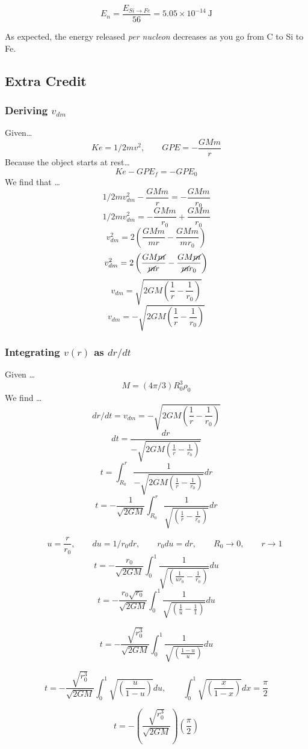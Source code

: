 \documentclass{article}
\begin{document}
\[
\boxed{
E_n = \frac{E_{Si\to Fe}}{56} = 5.05\times10^{-14}\ \mathrm{J}
}
\]

\noindent
As expected, the energy released \emph{per nucleon} decreases as you go from C to Si to Fe.

\subsection{Extra Credit}
\subsubsection{Deriving \(v_{dm}\)}
Given\dots
\[Ke = 1/2 mv^2, \qquad GPE = -\frac{GMm}{r}\]
 Because the object starts at rest\dots
\[Ke - GPE_{f} = - GPE_0\]
We find that \dots
\[1/2mv_{dm}^2 - \frac{GMm}{r} = -\frac{GMm}{r_0}\]
\[1/2mv_{dm}^2 = -\frac{GMm}{r_0} + \frac{GMm}{r_0}\]
\[v_{dm}^2 = 2\left(\frac{GMm}{mr} - \frac{GMm}{mr_0}\right)\]
\[v_{dm}^2 = 2\left(\frac{GM\cancel{m}}{\cancel{m}r} - \frac{GM\cancel{m}}{\cancel{m}r_0}\right)\]
\[v_{dm} = \sqrt{2GM\left(\frac{1}{r} - \frac{1}{r_0}\right)}\]
\[v_{dm} = -\sqrt{2GM\left(\frac{1}{r} - \frac{1}{r_0}\right)}\]
\pagebreak
\subsubsection{Integrating \(v(r)\) as \(dr/dt\)}
Given \dots
\[M = (4\pi/3)R_0^3\rho_0\]
We find \dots
\[dr/dt = v_{dm} = -\sqrt{2GM\left(\frac{1}{r} - \frac{1}{r_0}\right)}\]
\[dt = \frac{dr}{-\sqrt{2GM\left(\frac{1}{r} - \frac{1}{r_0}\right)}}\]
\[t = \int_{R_0}^{r} \frac{1}{-\sqrt{2GM\left(\frac{1}{r} - \frac{1}{r_0}\right)}}dr\]
\[t = -\frac{1}{\sqrt{2GM}} \int_{R_0}^{r} \frac{1}{\sqrt{\left(\frac{1}{r} - \frac{1}{r_0}\right)}}dr\]

\[\qquad u = \frac{r}{r_0}, \qquad du = 1/r_0dr, \qquad r_0du=dr, \qquad R_0 \rightarrow 0, \qquad r \rightarrow 1 \]
\[t = -\frac{r_0}{\sqrt{2GM}} \int_{0}^{1} \frac{1}{\sqrt{\left(\frac{1}{ur_0} - \frac{1}{r_0}\right)}} du\]
\[t = -\frac{r_0 \sqrt{r_0}}{\sqrt{2GM}} \int_{0}^{1} \frac{1}{\sqrt{\left(\frac{1}{u} - \frac{1}{1}\right)}} du\]

\[t = -\frac{\sqrt{r_0^3}}{\sqrt{2GM}} \int_{0}^{1} \frac{1}{\sqrt{\left(\frac{1 - u}{u}\right)}} du\]

\[t = -\frac{\sqrt{r_0^3}}{\sqrt{2GM}} \int_{0}^{1}\sqrt{\left(\frac{u}{1 - u}\right)} du, \qquad \int_{0}^{1}\sqrt{\left(\frac{x}{1 - x}\right)} dx = \frac{\pi}{2}\]

\[t = -\left(\frac{\sqrt{r_0^3}}{\sqrt{2GM}}\right)\left(\frac{\pi}{2}\right)\]

\[\]
\end{document}
